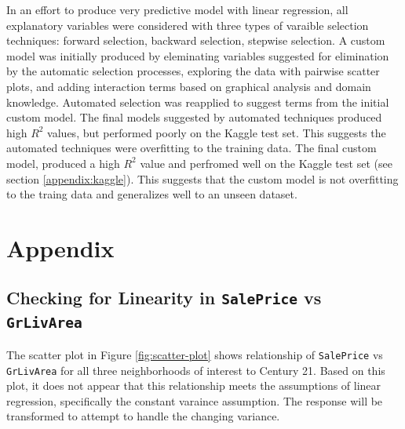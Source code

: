 \documentclass[american,]{article}
\begin{document}
In an effort to produce very predictive model with linear regression,
all explanatory variables were considered with three types of varaible
selection techniques: forward selection, backward selection, stepwise
selection. A custom model was initially produced by eleminating
variables suggested for elimination by the automatic selection
processes, exploring the data with pairwise scatter plots, and adding
interaction terms based on graphical analysis and domain knowledge.
Automated selection was reapplied to suggest terms from the initial
custom model. The final models suggested by automated techniques
produced high \(R^2\) values, but performed poorly on the Kaggle test
set. This suggests the automated techniques were overfitting to the
training data. The final custom model, produced a high \(R^2\) value and
perfromed well on the Kaggle test set (see section
\ref{appendix:kaggle}). This suggests that the custom model is not
overfitting to the traing data and generalizes well to an unseen
dataset.

\newpage

\hypertarget{appendix}{%
\section{Appendix}\label{appendix}}

\hypertarget{checking-for-linearity-in-saleprice-vs-grlivarea}{%
\subsection{\texorpdfstring{Checking for Linearity in \texttt{SalePrice}
vs
\texttt{GrLivArea}}{Checking for Linearity in SalePrice vs GrLivArea}}\label{checking-for-linearity-in-saleprice-vs-grlivarea}}

\label{appendix:linearity}

The scatter plot in Figure \ref{fig:scatter-plot} shows relationship of
\texttt{SalePrice} vs \texttt{GrLivArea} for all three neighborhoods of
interest to Century 21. Based on this plot, it does not appear that this
relationship meets the assumptions of linear regression, specifically
the constant varaince assumption. The response will be transformed to
attempt to handle the changing variance.
\end{document}
